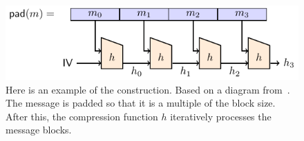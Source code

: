 \begin{figure}[t]
\includegraphics[width=\textwidth]{figures/app_crypto/merkle-damgard/merkle-damgaard.pdf}
\caption[Cryptographic hash function built with \MD{} construction]{Here
    is an example of the \MD{} construction.
    Based on a diagram from~\cite{TikZ:for:Cryptographers}.
    The message is padded so that it is a multiple of the block size.
    After this, the compression function $h$ iteratively processes
    the message blocks.}
\label{fig:md_construction}
\end{figure}
